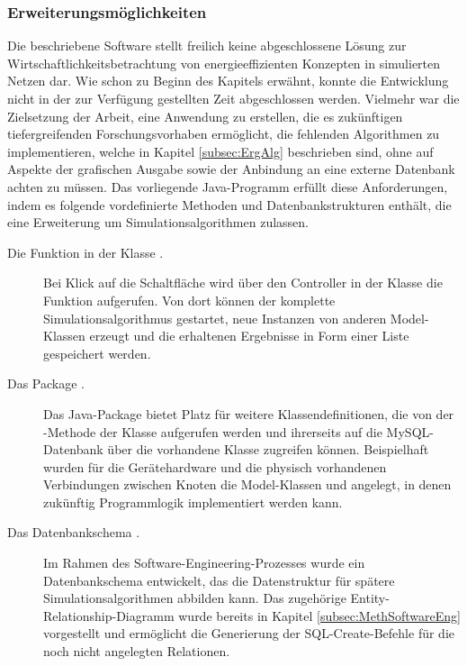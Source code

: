 \subsubsection{Erweiterungsmöglichkeiten} \label{subsubsec:ErgSoftwErweiterung}
Die beschriebene Software stellt freilich keine abgeschlossene Lösung zur Wirtschaftlichkeitsbetrachtung von energieeffizienten Konzepten in simulierten Netzen dar. Wie schon zu Beginn des Kapitels erwähnt, konnte die Entwicklung nicht in der zur Verfügung gestellten Zeit abgeschlossen werden. Vielmehr war die Zielsetzung der Arbeit, eine Anwendung zu erstellen, die es zukünftigen tiefergreifenden Forschungsvorhaben ermöglicht, die fehlenden Algorithmen zu implementieren, welche in Kapitel \ref{subsec:ErgAlg} beschrieben sind, ohne auf Aspekte der grafischen Ausgabe sowie der Anbindung an eine externe Datenbank achten zu müssen.
Das vorliegende Java-Programm erfüllt diese Anforderungen, indem es folgende vordefinierte Methoden und Datenbankstrukturen enthält, die eine Erweiterung um Simulationsalgorithmen zulassen.

\begin{description}
\item [Die Funktion  in der Klasse .] Bei Klick auf die Schaltfläche  wird über den Controller in der Klasse  die Funktion  aufgerufen. Von dort können der komplette Simulationsalgorithmus gestartet, neue Instanzen von anderen Model-Klassen erzeugt und die erhaltenen Ergebnisse in Form einer Liste gespeichert werden.
\item [Das Package .] Das Java-Package  bietet Platz für weitere Klassendefinitionen, die von der -Methode der Klasse  aufgerufen werden und ihrerseits auf die MySQL-Datenbank über die vorhandene Klasse  zugreifen können. Beispielhaft wurden für die Gerätehardware und die physisch vorhandenen Verbindungen zwischen Knoten die Model-Klassen  und  angelegt, in denen zukünftig Programmlogik implementiert werden kann.
\item [Das Datenbankschema .] Im Rahmen des Software-Engineering-Prozesses wurde ein Datenbankschema entwickelt, das die Datenstruktur für spätere Simulationsalgorithmen abbilden kann. Das zugehörige Entity-Relationship-Diagramm wurde bereits in Kapitel \ref{subsec:MethSoftwareEng} vorgestellt und ermöglicht die Generierung der SQL-Create-Befehle für die noch nicht angelegten Relationen.
\end{description}

